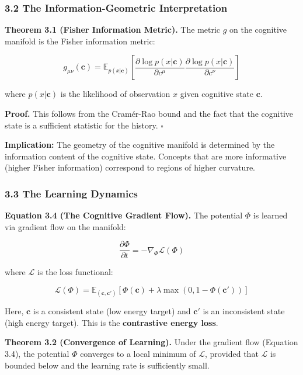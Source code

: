 \documentclass[
  11pt,
  a4paper,
]{article}
\begin{document}
\subsubsection{3.2 The Information-Geometric
Interpretation}\label{the-information-geometric-interpretation}

\textbf{Theorem 3.1 (Fisher Information Metric).} The metric \(g\) on
the cognitive manifold is the Fisher information metric:

\[g_{\mu\nu}(\mathbf{c}) = \mathbb{E}_{p(x|\mathbf{c})} \left[ \frac{\partial \log p(x|\mathbf{c})}{\partial c^\mu} \frac{\partial \log p(x|\mathbf{c})}{\partial c^\nu} \right]\]

where \(p(x|\mathbf{c})\) is the likelihood of observation \(x\) given
cognitive state \(\mathbf{c}\).

\textbf{Proof.} This follows from the Cramér-Rao bound and the fact that
the cognitive state is a sufficient statistic for the history.
\(\square\)

\textbf{Implication:} The geometry of the cognitive manifold is
determined by the information content of the cognitive state. Concepts
that are more informative (higher Fisher information) correspond to
regions of higher curvature.

\subsubsection{3.3 The Learning Dynamics}\label{the-learning-dynamics}

\textbf{Equation 3.4 (The Cognitive Gradient Flow).} The potential
\(\Phi\) is learned via gradient flow on the manifold:

\[\frac{\partial \Phi}{\partial t} = -\nabla_{\Phi} \mathcal{L}(\Phi)\]

where \(\mathcal{L}\) is the loss functional:

\[\mathcal{L}(\Phi) = \mathbb{E}_{(\mathbf{c}, \mathbf{c}')} \left[ \Phi(\mathbf{c}) + \lambda \max(0, 1 - \Phi(\mathbf{c}')) \right]\]

Here, \(\mathbf{c}\) is a consistent state (low energy target) and
\(\mathbf{c}'\) is an inconsistent state (high energy target). This is
the \textbf{contrastive energy loss}.

\textbf{Theorem 3.2 (Convergence of Learning).} Under the gradient flow
(Equation 3.4), the potential \(\Phi\) converges to a local minimum of
\(\mathcal{L}\), provided that \(\mathcal{L}\) is bounded below and the
learning rate is sufficiently small.
\end{document}
